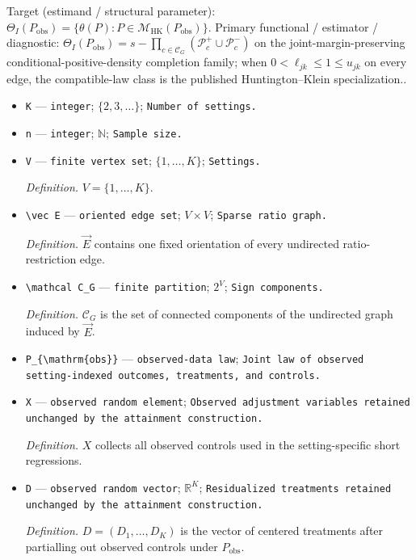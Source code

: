 \documentclass{article}
\begin{document}
Target (estimand / structural parameter): \(\Theta_I(P_{\mathrm{obs}})=\{\theta(P):P\in\mathcal M_{\mathrm{HK}}(P_{\mathrm{obs}})\}\).
Primary functional / estimator / diagnostic: \(\Theta_I(P_{\mathrm{obs}})=s-\prod_{c\in\mathcal C_G}(\mathcal P_c^+\cup\mathcal P_c^-)\) on the joint-margin-preserving conditional-positive-density completion family; when \(0<\ell_{jk}\le1\le u_{jk}\) on every edge, the compatible-law class is the published Huntington--Klein specialization..
\begin{itemize}
  \item \texttt{K} --- \texttt{integer}; \(\{2,3,\ldots\}\); \texttt{Number of settings.}
  \item \texttt{n} --- \texttt{integer}; \(\mathbb N\); \texttt{Sample size.}
  \item \texttt{V} --- \texttt{finite vertex set}; \(\{1,\ldots,K\}\); \texttt{Settings.}
  \par\smallskip\noindent\emph{Definition.} \(V=\{1,\ldots,K\}\).
  \item \texttt{\textbackslash{}\allowbreak{}vec E} --- \texttt{oriented edge set}; \(V\times V\); \texttt{Sparse ratio graph.}
  \par\smallskip\noindent\emph{Definition.} \(\vec E\) contains one fixed orientation of every undirected ratio-restriction edge.
  \item \texttt{\textbackslash{}\allowbreak{}mathcal C\_\allowbreak{}G} --- \texttt{finite partition}; \(2^V\); \texttt{Sign components.}
  \par\smallskip\noindent\emph{Definition.} \(\mathcal C_G\) is the set of connected components of the undirected graph induced by \(\vec E\).
  \item \texttt{P\_\allowbreak{}\{\textbackslash{}\allowbreak{}mathrm\{obs\}\allowbreak{}\}\allowbreak{}} --- \texttt{observed-\allowbreak{}data law}; \texttt{Joint law of observed setting-\allowbreak{}indexed outcomes,\allowbreak{} treatments,\allowbreak{} and controls.}
  \item \texttt{X} --- \texttt{observed random element}; \texttt{Observed adjustment variables retained unchanged by the attainment construction.}
  \par\smallskip\noindent\emph{Definition.} \(X\) collects all observed controls used in the setting-specific short regressions.
  \item \texttt{D} --- \texttt{observed random vector}; \(\mathbb R^K\); \texttt{Residualized treatments retained unchanged by the attainment construction.}
  \par\smallskip\noindent\emph{Definition.} \(D=(D_1,\ldots,D_K)\) is the vector of centered treatments after partialling out observed controls under \(P_{\mathrm{obs}}\).

\end{itemize}
\end{document}
